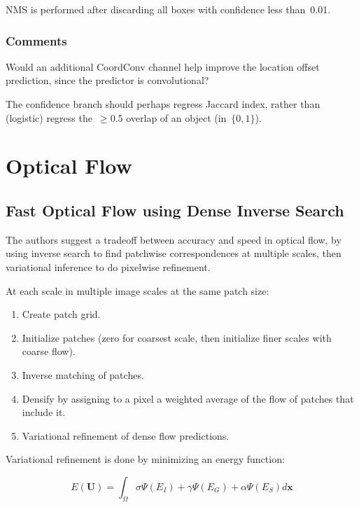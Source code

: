 \documentclass[a4paper, 12pt]{article}
\begin{document}
NMS is performed after discarding all boxes with confidence less
than~\num{0.01}.


\subsubsection{Comments}

Would an additional CoordConv channel help improve the location offset
prediction, since the predictor is convolutional?

The confidence branch should perhaps regress Jaccard index, rather than
(logistic) regress the~$\geq 0.5$ overlap of an object (in~$\{0, 1\}$).


\section{Optical Flow}


\subsection{Fast Optical Flow using Dense Inverse
            Search~\cite{kroeger2016fast}}

The authors suggest a tradeoff between accuracy and speed in optical flow, by
using inverse search to find patchwise correspondences at multiple scales, then
variational inference to do pixelwise refinement.

At each scale in multiple image scales at the same patch size:

\begin{enumerate}
        \item Create patch grid.

        \item Initialize patches (zero for coarsest scale, then initialize
                finer scales with coarse flow).

        \item Inverse matching of patches.

        \item Densify by assigning to a pixel a weighted average of the flow of
                patches that include it.

        \item Variational refinement of dense flow predictions.
\end{enumerate}

Variational refinement is done by minimizing an energy function:

\begin{equation*}
E(\mathbf{U}) = \int_\Omega \sigma\Psi(E_I) + \gamma\Psi(E_G) + \alpha\Psi(E_S) d\mathbf{x}
\end{equation*}
\end{document}
